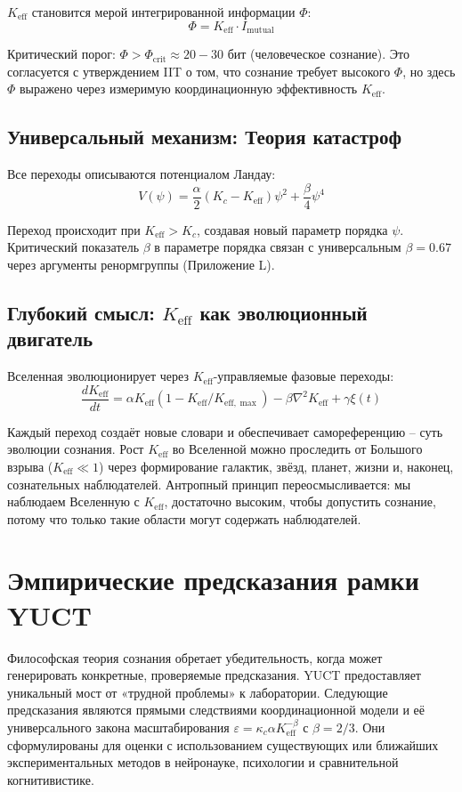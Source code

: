 \documentclass[12pt,a4paper]{article}
\newcommand{\eff}{\mathrm{eff}}
\newcommand{\Ke}{K_{\eff}}
\newcommand{\Kemax}{K_{\eff,\max}}
\begin{document}
	$\Ke$ становится мерой интегрированной информации $\Phi$:
	\[
	\Phi = \Ke \cdot I_{\text{mutual}}
	\]
	
	Критический порог: $\Phi > \Phi_{\text{crit}} \approx 20-30$ бит (человеческое сознание). Это согласуется с утверждением IIT о том, что сознание требует высокого $\Phi$, но здесь $\Phi$ выражено через измеримую координационную эффективность $\Ke$.
	
	\subsection{Универсальный механизм: Теория катастроф}
	
	Все переходы описываются потенциалом Ландау:
	\[
	V(\psi) = \frac{\alpha}{2}(K_c - \Ke)\psi^2 + \frac{\beta}{4}\psi^4
	\]
	
	Переход происходит при $\Ke > K_c$, создавая новый параметр порядка $\psi$. Критический показатель $\beta$ в параметре порядка связан с универсальным $\beta = 0.67$ через аргументы ренормгруппы (Приложение L).
	
	\subsection{Глубокий смысл: $\Ke$ как эволюционный двигатель}
	
	Вселенная эволюционирует через $\Ke$-управляемые фазовые переходы:
	\[
	\frac{d\Ke}{dt} = \alpha \Ke(1 - \Ke/\Kemax) - \beta \nabla^2 \Ke + \gamma \xi(t)
	\]
	
	Каждый переход создаёт новые словари и обеспечивает самореференцию – суть эволюции сознания. Рост $\Ke$ во Вселенной можно проследить от Большого взрыва ($\Ke \ll 1$) через формирование галактик, звёзд, планет, жизни и, наконец, сознательных наблюдателей. Антропный принцип переосмысливается: мы наблюдаем Вселенную с $\Ke$, достаточно высоким, чтобы допустить сознание, потому что только такие области могут содержать наблюдателей.
	
	\section{Эмпирические предсказания рамки YUCT}
	
	Философская теория сознания обретает убедительность, когда может генерировать конкретные, проверяемые предсказания. YUCT предоставляет уникальный мост от «трудной проблемы» к лаборатории. Следующие предсказания являются прямыми следствиями координационной модели и её универсального закона масштабирования \(\varepsilon = \kappa_c \alpha K_{\mathrm{eff}}^{-\beta}\) с \(\beta = 2/3\). Они сформулированы для оценки с использованием существующих или ближайших экспериментальных методов в нейронауке, психологии и сравнительной когнитивистике.
	
\end{document}
